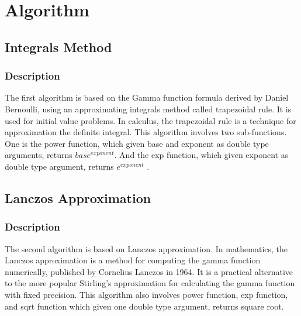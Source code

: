 \documentclass{report}
\begin{document}
\section{Algorithm}
\subsection{Integrals Method}
\subsubsection{Description}
The first algorithm is based on the Gamma function formula derived by Daniel Bernoulli, using an approximating integrals method called trapezoidal rule. It is used for initial value problems. In calculus, the trapezoidal rule is a technique for approximation the definite integral. This algorithm involves two sub-functions. One is the power function, which given base and exponent as double type arguments, returns $base^{exponent}$. And the exp function, which given exponent as double type argument, returns $e^{exponent}$ .

\subsection{Lanczos Approximation}
\subsubsection{Description}
The second algorithm is based on Lanczos approximation. In mathematics, the Lanczos approximation is a method for computing the gamma function numerically, published by Cornelius Lanczos in 1964. It is a practical alternative to the more popular Stirling's approximation for calculating the gamma function with fixed precision. This algorithm also involves power function, exp function, and sqrt function which given one double type argument, returns square root.
\clearpage
\end{document}
